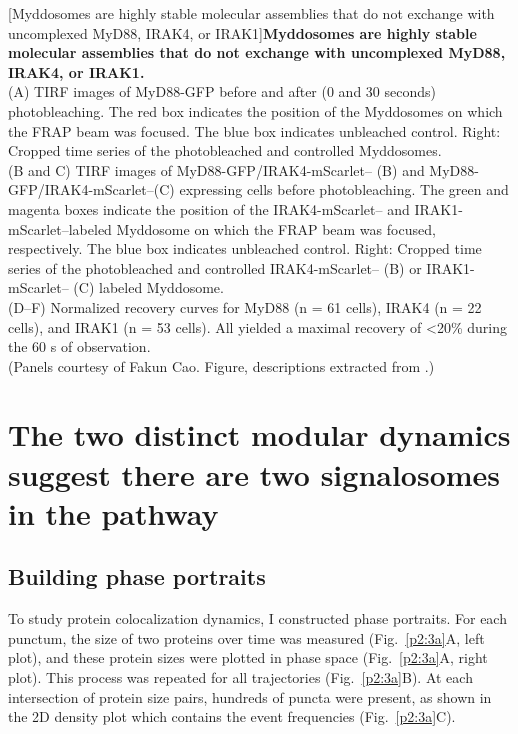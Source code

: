 \begin{centering}
\captionsetup{parbox=none}
[Myddosomes are highly stable molecular assemblies that do not exchange with uncomplexed MyD88, IRAK4, or IRAK1]{\textbf{Myddosomes are highly stable molecular assemblies that do not exchange with uncomplexed MyD88, IRAK4, or IRAK1.}
\vspace{1em}
\\
(A) TIRF images of MyD88-GFP before and after (0 and 30 seconds) photobleaching. The red box indicates the position of the Myddosomes on which the FRAP beam was focused. The blue box indicates unbleached control. Right: Cropped time series of the photobleached and controlled Myddosomes.
\vspace{1em}
\\
(B and C) TIRF images of MyD88-GFP/IRAK4-mScarlet-- (B) and MyD88-GFP/IRAK4-mScarlet--(C) expressing cells before photobleaching. The green and magenta boxes indicate the position of the IRAK4-mScarlet-- and IRAK1-mScarlet--labeled Myddosome on which the FRAP beam was focused, respectively. The blue box indicates unbleached control. Right: Cropped time series of the photobleached and controlled IRAK4-mScarlet-- (B) or IRAK1-mScarlet-- (C) labeled Myddosome.
\vspace{1em}
\\
(D--F) Normalized recovery curves for MyD88 (n = 61 cells), IRAK4 (n = 22 cells), and IRAK1 (n = 53 cells). All yielded a maximal recovery of <20\% during the 60 s of observation.
\vspace{1em}
\\
(Panels courtesy of Fakun Cao. Figure, descriptions extracted from \autocite{Deliz-Aguirre_2021}.)}
\label{p1:5}
\end{centering}

\section{The two distinct modular dynamics suggest there are two signalosomes in the pathway}
\label{section:dynamics}
\subsection{Building phase portraits}
To study protein colocalization dynamics, I constructed phase portraits. For each punctum, the size of two proteins over time was measured (Fig.~\ref{p2:3a}A, left plot), and these protein sizes were plotted in phase space (Fig.~\ref{p2:3a}A, right plot). This process was repeated for all trajectories (Fig.~\ref{p2:3a}B). At each intersection of protein size pairs, hundreds of puncta were present, as shown in the 2D density plot which contains the event frequencies (Fig.~\ref{p2:3a}C).

